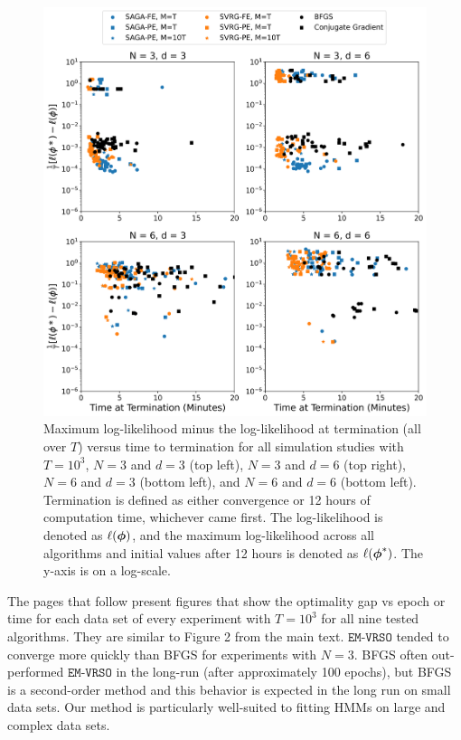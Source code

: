 \documentclass[12pt]{article}
\begin{document}
\begin{figure}[H]
    \centering
    \includegraphics[width=6.5in]{../plt/scatter_sim_T_1000_time.png}
    \caption{Maximum log-likelihood minus the log-likelihood at termination (all over $T$) versus time to termination for all simulation studies with $T=10^{3}$, $N=3$ and $d=3$ (top left), $N=3$ and $d=6$ (top right), $N=6$ and $d=3$ (bottom left), and $N=6$ and $d=6$ (bottom left). Termination is defined as either convergence or 12 hours of computation time, whichever came first. The log-likelihood is denoted as $\ell(\boldsymbol{\phi})$, and the maximum log-likelihood across all algorithms and initial values after 12 hours is denoted as $\ell(\boldsymbol{\phi}^*)$. The y-axis is on a log-scale.}
    \label{fig:scatter_sim}
\end{figure}


\newpage 

The pages that follow present figures that show the optimality gap vs epoch or time for each data set of every experiment with $T=10^{3}$ for all nine tested algorithms. They are similar to Figure 2 from the main text. $\texttt{EM-VRSO}$ tended to converge more quickly than BFGS for experiments with $N=3$. BFGS often out-performed $\texttt{EM-VRSO}$ in the long-run (after approximately 100 epochs), but BFGS is a second-order method and this behavior is expected in the long run on small data sets. Our method is particularly well-suited to fitting HMMs on large and complex data sets. 
\end{document}
